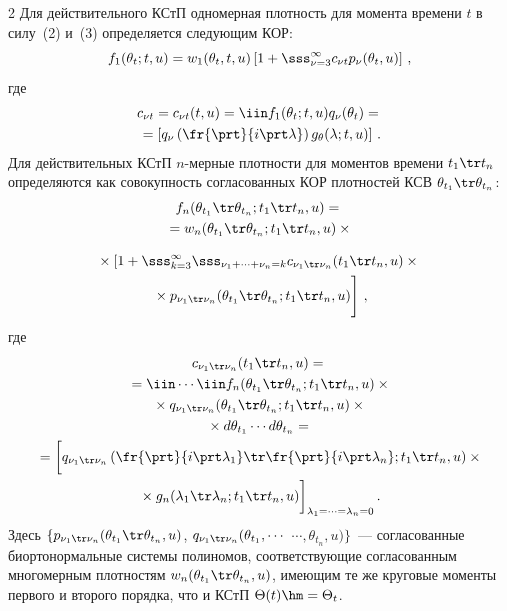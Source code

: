 \begin{multicols}{2}
Для действительного КСтП одномерная плот\-ность для 
момента времени $t$ в силу~(2) и~(3) определяется следующим КОР:
\begin{equation}
f_1 (\theta_t; t,u) = w_1(\theta_t, t,u) \left[ 
1 + \sss_{\nu=3}^\infty c_{\nu t} p_\nu (\theta_t,u) \right]\,,\label{e5s}
\end{equation}
где
\begin{multline*}
c_{\nu t}=c_{\nu t} (t,u)= \iin f_1(\theta_t;t,u) q_\nu(\theta_t) = {}\\
{}=
\left[ q_\nu \left(\fr{\prt}{i \prt \lambda}\right) g_\theta (\lambda;t,u)\right]\,.
\end{multline*}
Для действительных КСтП $n$-мер\-ные плот\-ности для моментов времени  $t_1\tr t_n$ 
определяются как совокупность согласованных КОР плот\-ностей КСВ  
$\theta_{t_1} \tr \theta_{t_n}$:
\begin{multline*}
 f_n (\theta_{t_1}\tr \theta_{t_n}; t_1\tr t_n,u) ={}\\
 {}=
 w_n (\theta_{t_1}\tr \theta_{t_n}; t_1\tr t_n,u)\times{}
 \end{multline*}
 
 \noindent
 \begin{multline}
{}\times \left[ 1+ \sss_{k=3}^\infty \sss_{\nu_1+\cdots+\nu_n =k} 
c_{\nu_1 \tr \nu_n} (t_1\tr t_n,u) \times{}\right.\\
\left.{}\times p_{\nu_1\tr \nu_n} (\theta_{t_1} \tr \theta_{t_n}; t_1\tr t_n,u) 
\vphantom{\sum\limits_{k=3}^\infty}\right]\,,
\label{e7s}
\end{multline}
где
\begin{multline*}
c_{\nu_1\tr \nu_n} (t_1\tr t_n,u) = {}\\
{}=\iin\cdots \iin f_n (\theta_{t_1}\tr \theta_{t_n}; t_1\tr t_n,u)\times{}\\
{}\times q_{\nu_1\tr \nu_n}(\theta_{t_1}\tr \theta_{t_n}; t_1\tr t_n,u)\times{}\\
{}\times d\theta_{t_1}\cdots  d\theta_{t_n}={}\\
{}= \biggl[ q_{\nu_1\tr \nu_n} \left( \fr{\prt}{ i\prt \lambda_1}\tr \fr{\prt}{i\prt \lambda_n}; 
t_1\tr t_n,u\right)\times{}\\
{}\times g_n (\lambda_1\tr \lambda_n; t_1\tr t_n,u)\biggr]_{\lambda_1 =\cdots = \lambda_n=0}\,.
\end{multline*}
Здесь $\{ p_{\nu_1\tr \nu_n} (\theta_{t_1}\tr \theta_{t_n},u)$, 
$q_{\nu_1\tr \nu_n} (\theta_{t_1} , \cdots$\linebreak 
$\cdots , \theta_{t_n},u)\}$~--- согласованные биортонормальные 
сис\-те\-мы полиномов, соответствующие согласованным многомерным плотностям 
$w_n (\theta_{t_1}\tr \theta_{t_n},u)$, имеющим те же круговые моменты первого и второго порядка, 
что и КСтП $\Theta(t)\hm=\Theta_t$.


\end{multicols}
